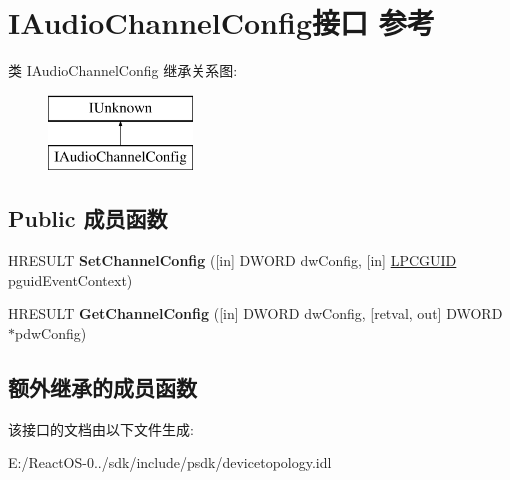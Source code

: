 \hypertarget{interface_i_audio_channel_config}{}\section{I\+Audio\+Channel\+Config接口 参考}
\label{interface_i_audio_channel_config}
类 I\+Audio\+Channel\+Config 继承关系图\+:\begin{figure}[H]
\begin{center}
\leavevmode
\includegraphics[height=2.000000cm]{interface_i_audio_channel_config}
\end{center}
\end{figure}
\subsection*{Public 成员函数}
\begin{DoxyCompactItemize}
\item 
\mbox{\label{interface_i_audio_channel_config_aef1bec011fe8a2c4f977803d51edbc50}} 
H\+R\+E\+S\+U\+LT {\bfseries Set\+Channel\+Config} (\mbox{[}in\mbox{]} D\+W\+O\+RD dw\+Config, \mbox{[}in\mbox{]} \hyperlink{interface_g_u_i_d}{L\+P\+C\+G\+U\+ID} pguid\+Event\+Context)
\item 
\mbox{\label{interface_i_audio_channel_config_a10d2da2511b310a34ef24aadd0750ae3}} 
H\+R\+E\+S\+U\+LT {\bfseries Get\+Channel\+Config} (\mbox{[}in\mbox{]} D\+W\+O\+RD dw\+Config, \mbox{[}retval, out\mbox{]} D\+W\+O\+RD $\ast$pdw\+Config)
\end{DoxyCompactItemize}
\subsection*{额外继承的成员函数}


该接口的文档由以下文件生成\+:\begin{DoxyCompactItemize}
\item 
E\+:/\+React\+O\+S-\/0../sdk/include/psdk/devicetopology.\+idl\end{DoxyCompactItemize}
